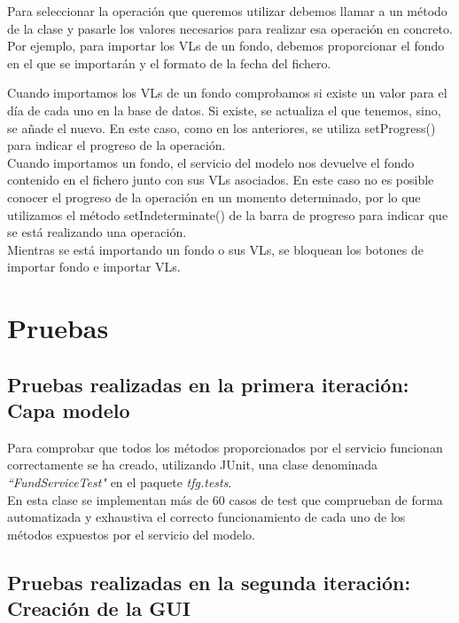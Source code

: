 \documentclass[12pt, a4paper]{book}
\begin{document}
Para seleccionar la operación que queremos utilizar debemos llamar a un método de la clase y pasarle los valores necesarios para realizar esa operación en concreto. Por ejemplo, para importar los \gls{VL}s de un fondo, debemos proporcionar el fondo en el que se importarán y el formato de la fecha del fichero.\\

\newpage

Cuando importamos los \gls{VL}s de un fondo comprobamos si existe un valor para el día de cada uno en la base de datos. Si existe, se actualiza el que tenemos, sino, se añade el nuevo. En este caso, como en los anteriores, se utiliza setProgress() para indicar el progreso de la operación.\\

Cuando importamos un fondo, el servicio del modelo nos devuelve el fondo contenido en el fichero junto con sus \gls{VL}s asociados. En este caso no es posible conocer el progreso de la operación en un momento determinado, por lo que utilizamos el método setIndeterminate() de la barra de progreso para indicar que se está realizando una operación.\\

Mientras se está importando un fondo o sus \gls{VL}s, se bloquean los botones de importar fondo e importar \gls{VL}s.



\newpage

\chapter{Pruebas}

\section{Pruebas realizadas en la primera iteración: Capa modelo}

Para comprobar que todos los métodos proporcionados por el servicio funcionan correctamente se ha creado, utilizando JUnit, una clase denominada \textit{``FundServiceTest"} en el paquete \textit{tfg.tests}.\\

En esta clase se implementan más de 60 casos de test que comprueban de forma automatizada y exhaustiva el correcto funcionamiento de cada uno de los métodos expuestos por el servicio del modelo.


\section{Pruebas realizadas en la segunda iteración: Creación de la GUI}
\end{document}
